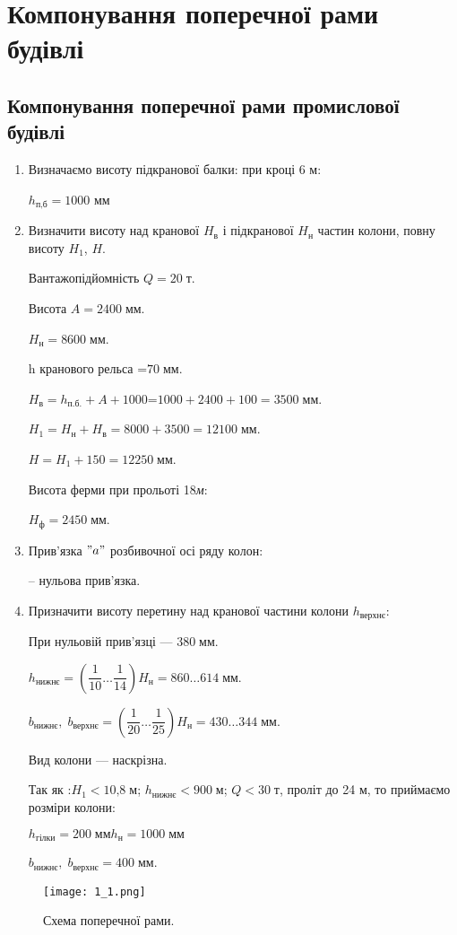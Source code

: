 \documentclass[a4paper,14pt]{article}
\author{}
\title{}
\date{\today}
\begin{document}
\section{Компонування поперечної рами будівлі}
\subsection{Компонування поперечної рами промислової будівлі}
\begin{enumerate}
\item Визначаємо висоту підкранової балки: при кроці 6 м:

$h_{\textit{п,б}}=1000$ мм

\item Визначити висоту над кранової $H_{\textit{в}}$ і підкранової $H_{\textit{н}}$ частин колони, повну висоту $H_{\textit{1}}$, $H$.

Вантажопідйомність $Q= 20\;{\textit{т}}$.

Висота $A=2400\;{\textit{мм}}$.

$H_{\textit{н}}=8600\;{\textit{мм}}$.

h кранового рельса =$70\;{\textit{мм}}$.

$H_{\textit{в}}=h_{\textit{п.б.}}+A+1000$=$1000+2400+100=3500\;\textit{мм}$.

$H_1=H_{\textit{н}}+H_{\textit{в}}=8000+3500=12100\;\textit{мм}$.

$H=H_1+150=12250\;\textit{мм}$.

Висота ферми при прольоті 18\;\textit{м}\;:

$H_{\textit{ф}}=2450\;\textit{мм}$.

\item Прив'язка $"a"$ розбивочної осі ряду колон:

-- нульова прив'язка.

\item Призначити висоту перетину над кранової частини колони $h_{\textit{верхнє}}$:

При нульовій прив'язці --- $380\;{\textit{мм}}$.

$h_{\textit{нижнє}}=\left(\dfrac{1}{10}\ldots\dfrac{1}{14}\right)H_\textit{н}=860\ldots614\;\textit{мм}$.

$b_{\textit{нижнє}},\;b_{\textit{верхнє}}=\left(\dfrac{1}{20}\ldots\dfrac{1}{25}\right)H_\textit{н}=430\ldots344\;\textit{мм}$.

Вид колони --- наскрізна.

Так як :$H_1<\textit{10,8}\;\textit{м}$; $h_\textit{нижнє}<\textit{900}\;\textit{м}$; $Q<\textit{30}\;\textit{т}$, проліт до 24 м, то приймаємо розміри колони:

$h_{\textit{гілки}}=200\;\textit{мм}$\;$h_{\textit{н}}=1000\;\textit{мм}$

$b_{\textit{нижнє}},\;b_{\textit{верхнє}}=400\;\textit{мм}$.
\end{enumerate}
\newpage
\begin{figure}[h]
    \texttt{[image: 1\_1.png]}
    \caption{Схема поперечної рами.}\label{ris1_1} 
\end{figure}
\newpage
\end{document}
